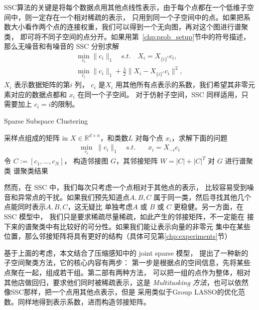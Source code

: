 \documentclass[main]{subfiles}
\begin{document}
SSC算法的关键是将每个数据点用其他点线性表示，由于每个点都在一个低维子空间中，则一定存在一个相对稀疏的表示，
只用到同一个子空间中的点。如果把系数大小看作两个点的连接权重，我们可以得到一个无向图，再对这个图进行谱聚类，
即可将不同子空间的点分开。如果用第~\ref{chp:prob_setup}节中的符号描述，那么无噪音和有噪音的 SSC 分别求解
\begin{align*}
  \min_{c_i} \|c_i\|_1\quad s.t.\quad X_i=X_{\{i\}^c}c_i, \\
  \min_{c_i} \|c_i\|_1+\frac{\lambda}{2}\|X_i-X_{\{i\}^c}c_i\|^2,
\end{align*}
$X_i$ 表示数据矩阵的第$i$ 列， $c_i$ 是$X_i$ 用其他所有点表示的系数，我们希望其非零元素对应的数据点都和 $x_i$ 在同一个子空间。
对于仿射子空间，SSC 同样适用，只需要加上 $c_i = i$的限制。

\begin{algorithm}[tb]
  \caption{Sparse Subspace Clustering}
  \label{alg:SSC}
  \begin{algorithmic}
    采样点组成的矩阵 in $X\in \mathbb{R}^{d\times n}$，和类数$L$
     对每个点 $x_i$，求解下面的问题
    \begin{align}\label{eq:SSC}
      \min_{c_i} \; \|c_i\|_1 \quad s.t. \quad &x_i=X_{-i}c_i
    \end{align}
     令 $C:=[c_1,...,c_N]$， 构造邻接图 $G$，其邻接矩阵 $W=|C|+|C|^T$
     对 $G$ 进行谱聚类 
     谱聚类结果
  \end{algorithmic}
\end{algorithm}

然而，在 SSC 中，我们每次只考虑一个点相对于其他点的表示，
比较容易受到噪音和异常点的干扰。如果我们预先知道点$A,B,C$
属于同一类，然后寻找其他几个点能同时表示$A,B,C$，这无疑比
单独考虑$A$ 或 $B$ 或 $C$ 更稳健。另一方面，在SSC 模型中，
我们只是要求稀疏尽量稀疏，如此产生的邻接矩阵，不一定能在
接下来的谱聚类中有比较好的可分性。如果我们能让表示向量的非零元
集中在某些位置，那么邻接矩阵将具有更好的结构（具体可见第\ref{chp:experiments}节）

基于上面的考虑，本文结合了压缩感知中的 joint sparse 模型\cite{}， 提出了一种新的子空间聚类方法，它的核心内容有两步：
第一步是根据点的空间信息，先将某些点聚在一起，组成若干组。第二部有两种方法，
可以把一组的点作为整体，相对其他店做回归，要求他们同时被稀疏表示，这是
\emph{Multitasking 方法}，也可以依然像SSC那样，把一个点用其他点表示，但是
采用类似于Group LASSO的优化范数。同样地得到表示系数，进而构造邻接矩阵。
\end{document}
